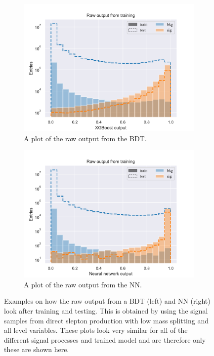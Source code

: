 \begin{figure}[H]
    \centering
    \begin{subfigure}[t!]{0.49\textwidth}
        \includegraphics[width = \textwidth]{Figures/SlepSlep/ML/BDT/All_level/Low/rawPlot.pdf}
        \caption{A plot of the raw output from the BDT.}
        \label{fig:SlepSlepBDTLowLevelLowRaw}
    \end{subfigure}
    \begin{subfigure}[t!]{0.49\textwidth}
        \includegraphics[width = \textwidth]{Figures/SlepSlep/ML/NN/All_level/High/rawPlot.pdf}
        \caption{A plot of the raw output from the NN.}
        \label{fig:SlepSlepNNLowLevelHighRaw}
    \end{subfigure}
    \caption{Examples on how the raw output from a BDT (left) and NN (right) look after training and testing. This is obtained by using the signal samples from direct slepton production with low mass splitting and all level variables. These plots look very similar for all of the different signal processes and trained model and are therefore only these are shown here.}
    \label{fig:rawOutput}
\end{figure}



